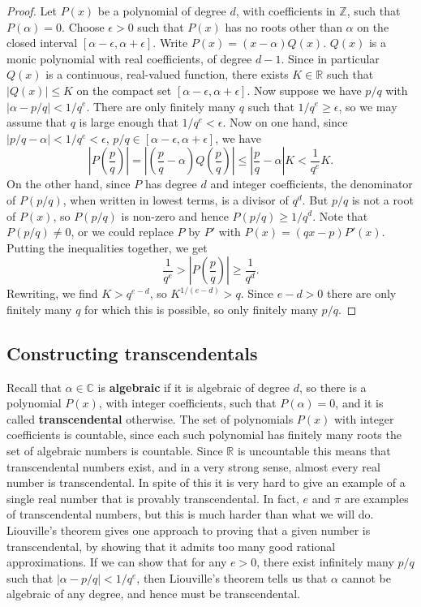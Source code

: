 \documentclass{article}
\newcommand{\Z}{\mathbb{Z}}
\newcommand{\R}{\mathbb{R}}
\newcommand{\C}{\mathbb{C}}
\newcommand{\rb}[1]{\left( #1 \right)}
\renewcommand{\sb}[1]{\left[ #1 \right]}
\newcommand{\abs}[1]{\left\lvert #1 \right\rvert}
\theoremstyle{definition}\newtheorem{definition}{Definition}
\theoremstyle{definition}\newtheorem{remark}[definition]{Remark}
\theoremstyle{definition}\newtheorem*{example}{Example}
\theoremstyle{definition}\newtheorem*{note}{Note}
\begin{document}
\begin{proof}
Let $ P\rb{x} $ be a polynomial of degree $ d $, with coefficients in $ \Z $, such that $ P\rb{\alpha} = 0 $. Choose $ \epsilon > 0 $ such that $ P\rb{x} $ has no roots other than $ \alpha $ on the closed interval $ \sb{\alpha - \epsilon, \alpha + \epsilon} $. Write $ P\rb{x} = \rb{x - \alpha}Q\rb{x} $. $ Q\rb{x} $ is a monic polynomial with real coefficients, of degree $ d - 1 $. Since in particular $ Q\rb{x} $ is a continuous, real-valued function, there exists $ K \in \R $ such that $ \abs{Q\rb{x}} \le K $ on the compact set $ \sb{\alpha - \epsilon, \alpha + \epsilon} $. Now suppose we have $ p / q $ with $ \abs{\alpha - p / q} < 1 / q^e $. There are only finitely many $ q $ such that $ 1 / q^e \ge \epsilon $, so we may assume that $ q $ is large enough that $ 1 / q^e < \epsilon $. Now on one hand, since $ \abs{p / q - \alpha} < 1 / q^e < \epsilon $, $ p / q \in \sb{\alpha - \epsilon, \alpha + \epsilon} $, we have
$$ \abs{P\rb{\dfrac{p}{q}}} = \abs{\rb{\dfrac{p}{q} - \alpha}Q\rb{\dfrac{p}{q}}} \le \abs{\dfrac{p}{q} - \alpha}K < \dfrac{1}{q^e}K. $$
On the other hand, since $ P $ has degree $ d $ and integer coefficients, the denominator of $ P\rb{p / q} $, when written in lowest terms, is a divisor of $ q^d $. But $ p / q $ is not a root of $ P\rb{x} $, so $ P\rb{p / q} $ is non-zero and hence $ P\rb{p / q} \ge 1 / q^d $. Note that $ P\rb{p / q} \ne 0 $, or we could replace $ P $ by $ P' $ with $ P\rb{x} = \rb{qx - p}P'\rb{x} $. Putting the inequalities together, we get
$$ \dfrac{1}{q^e} > \abs{P\rb{\dfrac{p}{q}}} \ge \dfrac{1}{q^d}. $$
Rewriting, we find $ K > q^{e - d} $, so $ K^{1 / \rb{e - d}} > q $. Since $ e - d > 0 $ there are only finitely many $ q $ for which this is possible, so only finitely many $ p / q $.
\end{proof}

\subsection{Constructing transcendentals}

Recall that $ \alpha \in \C $ is \textbf{algebraic} if it is algebraic of degree $ d $, so there is a polynomial $ P\rb{x} $, with integer coefficients, such that $ P\rb{\alpha} = 0 $, and it is called \textbf{transcendental} otherwise. The set of polynomials $ P\rb{x} $ with integer coefficients is countable, since each such polynomial has finitely many roots the set of algebraic numbers is countable. Since $ \R $ is uncountable this means that transcendental numbers exist, and in a very strong sense, almost every real number is transcendental. In spite of this it is very hard to give an example of a single real number that is provably transcendental. In fact, $ e $ and $ \pi $ are examples of transcendental numbers, but this is much harder than what we will do. Liouville's theorem gives one approach to proving that a given number is transcendental, by showing that it admits too many good rational approximations. If we can show that for any $ e > 0 $, there exist infinitely many $ p / q $ such that $ \abs{\alpha - p / q} < 1 / q^e $, then Liouville's theorem tells us that $ \alpha $ cannot be algebraic of any degree, and hence must be transcendental.
\end{document}
